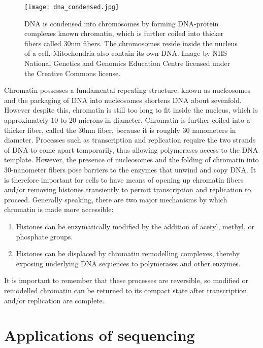 \begin{figure}[h]
   \centering
   \texttt{[image: dna\_condensed.jpg]}
   \caption[Condensation of DNA]{DNA is condensed into chromosomes by forming DNA-protein complexes known chromatin, which is further coiled into thicker fibers called 30nm fibers. The chromosomes reside inside the nucleus of a cell. Mitochondria also contain its own DNA. Image by NHS National Genetics and Genomics Education Centre licensed under the Creative Commons license.}
   \label{fig:dna_condensed}
\end{figure}

Chromatin possesses a fundamental repeating structure\cite{holde01111974}, known as nucleosomes and the packaging of DNA into nucleosomes shortens DNA about sevenfold. However despite this, chromatin is still too long to fit inside the nucleus, which is approximately 10 to 20 microns in diameter. Chromatin is further coiled into a thicker fiber, called the 30nm fiber, because it is roughly 30 nanometers in diameter. Processes such as transcription and replication require the two strands of DNA to come apart temporarily, thus allowing polymerases access to the DNA template. However, the presence of nucleosomes and the folding of chromatin into 30-nanometer fibers pose barriers to the enzymes that unwind and copy DNA. It is therefore important for cells to have means of opening up chromatin fibers and/or removing histones transiently to permit transcription and replication to proceed. Generally speaking, there are two major mechanisms by which chromatin is made more accessible:

\begin{enumerate}
   \item Histones can be enzymatically modified by the addition of acetyl, methyl, or phosphate groups.
   \item Histones can be displaced by chromatin remodelling complexes, thereby exposing underlying DNA sequences to polymerases and other enzymes.
\end{enumerate}

It is important to remember that these processes are reversible, so modified or remodelled chromatin can be returned to its compact state after transcription and/or replication are complete.

\section{Applications of sequencing}

